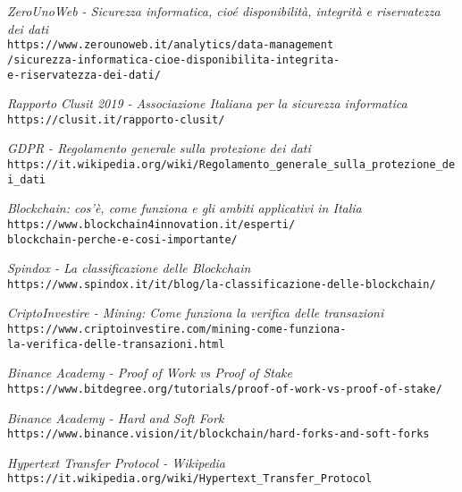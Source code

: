 \begin{thebibliography}{9}
\textit{ZeroUnoWeb - Sicurezza informatica, cioé disponibilità, integrità e riservatezza dei dati}
\\\texttt{https://www.zerounoweb.it/analytics/data-management}
\\\texttt{/sicurezza-informatica-cioe-disponibilita-integrita-}
\\\texttt{e-riservatezza-dei-dati/}

\textit{Rapporto Clusit 2019 - Associazione Italiana per la sicurezza informatica}
\\\texttt{https://clusit.it/rapporto-clusit/}

\textit{GDPR - Regolamento generale sulla protezione dei dati}
\\\texttt{https://it.wikipedia.org/wiki/Regolamento\_generale\_sulla\_protezione\_dei\_dati}

\textit{Blockchain: cos’è, come funziona e gli ambiti applicativi in Italia}
\\\texttt{https://www.blockchain4innovation.it/esperti/}
\\\texttt{blockchain-perche-e-cosi-importante/}

\textit{Spindox - La classificazione delle Blockchain}
\\\texttt{https://www.spindox.it/it/blog/la-classificazione-delle-blockchain/}

\textit{CriptoInvestire - Mining: Come funziona la verifica delle transazioni}
\\\texttt{https://www.criptoinvestire.com/mining-come-funziona-}
\\\texttt{la-verifica-delle-transazioni.html}

\textit{Binance Academy - Proof of Work vs Proof of Stake}
\\\texttt{https://www.bitdegree.org/tutorials/proof-of-work-vs-proof-of-stake/}

\textit{Binance Academy - Hard and Soft Fork}
\\\texttt{https://www.binance.vision/it/blockchain/hard-forks-and-soft-forks}

\textit{Hypertext Transfer Protocol - Wikipedia}
\\\texttt{https://it.wikipedia.org/wiki/Hypertext\_Transfer\_Protocol}


\end{thebibliography}
